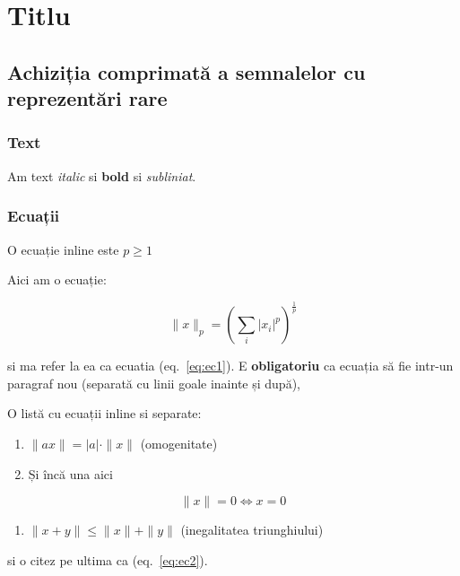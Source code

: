 \documentclass[]{article}
\date{}
\providecommand{\tightlist}{%
  \setlength{\itemsep}{0pt}\setlength{\parskip}{0pt}}
\begin{document}
\section{Titlu}\label{titlu}

\subsection{Achiziția comprimată a semnalelor cu reprezentări
rare}\label{sec:stateart}

\subsubsection{Text}\label{text}

Am text \emph{italic} si \textbf{bold} si \emph{subliniat}.

\subsubsection{Ecuații}\label{sec:ecuatii}

O ecuație inline este \(p \geq 1\)

Aici am o ecuație:

\begin{equation}
 \|x\|_p = \left( \sum_i |x_i|^p \right) ^\frac{1}{p}
\label{eq:ec1}\end{equation}

si ma refer la ea ca ecuatia (eq.~\ref{eq:ec1}). E \textbf{obligatoriu}
ca ecuația să fie intr-un paragraf nou (separată cu linii goale inainte
și după),

O listă cu ecuații inline si separate:

\begin{enumerate}
\def\labelenumi{\arabic{enumi}.}
\item
  \(\|ax\| = |a| \cdot \|x\|\) (omogenitate)
\item
  Și încă una aici
\end{enumerate}

\begin{equation}\|x\| = 0 \iff x=0\label{eq:ec2}\end{equation}

\begin{enumerate}
\def\labelenumi{\arabic{enumi}.}
\tightlist
\item
  \(\|x + y\| \leq \|x\| + \|y\|\) (inegalitatea triunghiului)
\end{enumerate}

si o citez pe ultima ca (eq.~\ref{eq:ec2}).
\end{document}
